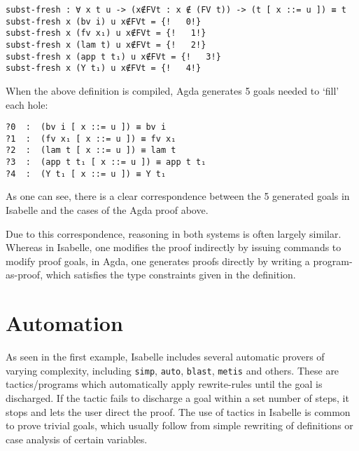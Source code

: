 \documentclass[a4paper, 12pt, twoside]{style/ociamthesis}
\theoremstyle{plain}
\theoremstyle{definition}
\theoremstyle{remark}
\begin{document}
\begin{verbatim}
subst-fresh : ∀ x t u -> (x∉FVt : x ∉ (FV t)) -> (t [ x ::= u ]) ≡ t
subst-fresh x (bv i) u x∉FVt = {!   0!}
subst-fresh x (fv x₁) u x∉FVt = {!   1!}
subst-fresh x (lam t) u x∉FVt = {!   2!}
subst-fresh x (app t t₁) u x∉FVt = {!   3!}
subst-fresh x (Y t₁) u x∉FVt = {!   4!}
\end{verbatim}

When the above definition is compiled, Agda generates 5 goals needed to
`fill' each hole:

\begin{verbatim}
?0  :  (bv i [ x ::= u ]) ≡ bv i
?1  :  (fv x₁ [ x ::= u ]) ≡ fv x₁
?2  :  (lam t [ x ::= u ]) ≡ lam t
?3  :  (app t t₁ [ x ::= u ]) ≡ app t t₁
?4  :  (Y t₁ [ x ::= u ]) ≡ Y t₁
\end{verbatim}

As one can see, there is a clear correspondence between the 5 generated
goals in Isabelle and the cases of the Agda proof above.

Due to this correspondence, reasoning in both systems is often largely
similar. Whereas in Isabelle, one modifies the proof indirectly by
issuing commands to modify proof goals, in Agda, one generates proofs
directly by writing a program-as-proof, which satisfies the type
constraints given in the definition.

\section{Automation}\label{automation}

As seen in the first example, Isabelle includes several automatic
provers of varying complexity, including \texttt{simp}, \texttt{auto},
\texttt{blast}, \texttt{metis} and others. These are tactics/programs
which automatically apply rewrite-rules until the goal is discharged. If
the tactic fails to discharge a goal within a set number of steps, it
stops and lets the user direct the proof. The use of tactics in Isabelle
is common to prove trivial goals, which usually follow from simple
rewriting of definitions or case analysis of certain variables.
\end{document}
